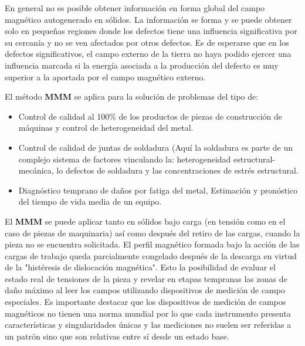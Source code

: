 En general no es posible obtener información en forma global del campo magnético autogenerado en sólidos. La información se forma y se puede obtener solo en pequeñas regiones donde los defectos tiene una influencia significativa por su cercanía y no se ven afectados por otros defectos. Es de esperarse que en los defectos significativos, el campo externo de la tierra no haya podido ejercer una influencia marcada si la energía asociada a la producción del defecto es muy superior a la aportada por el campo magnético externo.

El método \textbf{MMM} se aplica para la solución de problemas del tipo de:


\begin{itemize}
	\item Control de calidad al 100\% de los productos de piezas de construcción de máquinas y control de heterogeneidad del metal.
	
	\item Control de calidad de juntas de soldadura (Aquí la soldadura es parte de un complejo sistema de factores vinculando la: heterogeneidad estructural-mecánica, lo defectos de soldadura y las concentraciones de estrés estructural.
	
	\item Diagnóstico temprano de daños por fatiga del metal, Estimación y pronóstico del tiempo de vida media de un equipo.
	
\end{itemize}

El \textbf{MMM} se puede aplicar tanto en sólidos bajo carga (en tensión como en el caso de piezas de maquinaria) así como después del retiro de las cargas, cuando la pieza no se encuentra solicitada. El perfil magnético formada bajo la acción de las cargas de trabajo queda parcialmente congelado después de la descarga en virtud de la "histéresis de dislocación magnética". Esto la posibilidad de evaluar el estado real de tensiones de la pieza y revelar en etapas tempranas las zonas de daño máximo al leer los campos utilizando dispositivos de medición de campo especiales. Es importante destacar que los dispositivos de medición de campos magnéticos no tienen una norma mundial por lo que cada instrumento presenta características y singularidades únicas y las mediciones no suelen ser referidas a un patrón sino que son relativas entre sí desde un estado base.

